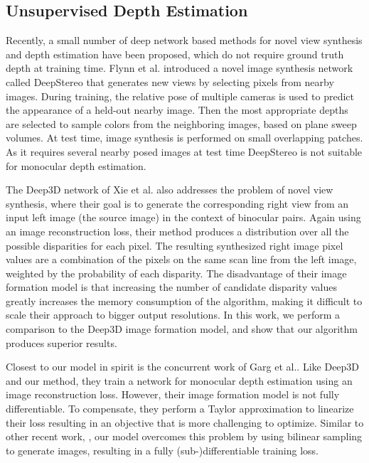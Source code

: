 \documentclass[10pt,twocolumn,letterpaper]{article}
\makeatletter
\newcommand*{\ea}{et al.\@\xspace}
\makeatother
\begin{document}
\subsection*{Unsupervised Depth Estimation}
Recently, a small number of deep network based methods for novel view synthesis and depth estimation have been proposed, which do not require ground truth depth at training time. 
Flynn \ea\cite{flynn2015deepstereo} introduced a novel image synthesis network called DeepStereo that generates new views by selecting pixels from nearby images. 
During training, the relative pose of multiple cameras is used to predict the appearance of a held-out nearby image. Then the most appropriate depths are selected to sample colors from the neighboring images, based on plane sweep volumes.
At test time, image synthesis is performed on small overlapping patches. 
As it requires several nearby posed images at test time DeepStereo is not suitable for monocular depth estimation. 

The Deep3D network of Xie \ea\cite{xie2016deep3d} also addresses the problem of novel view synthesis, where their goal is to generate the corresponding right view from an input left image (\ie the source image) in the context of binocular pairs.
Again using an image reconstruction loss, their method produces a distribution over all the possible disparities for each pixel. 
The resulting synthesized right image pixel values are a combination of the pixels on the same scan line from the left image, weighted by the probability of each disparity. 
The disadvantage of their image formation model is that increasing the number of candidate disparity values greatly increases the memory consumption of the algorithm, making it difficult to scale their approach to bigger output resolutions.
In this work, we perform a comparison to the Deep3D image formation model, and show that our algorithm produces superior results. 

Closest to our model in spirit is the concurrent work of Garg \ea\cite{garg2016unsupervised}.
Like Deep3D and our method, they train a network for monocular depth estimation using an image reconstruction loss. 
However, their image formation model is not fully differentiable. To compensate, they perform a Taylor approximation to linearize their loss resulting in an objective that is more challenging to optimize. 
Similar to other recent work, \eg\cite{patraucean2015spatio, zhou2016learning, zhou2016view}, our model overcomes this problem by using bilinear sampling \cite{jaderberg2015spatial} to generate images, resulting in a fully (sub-)differentiable training loss.
\end{document}
